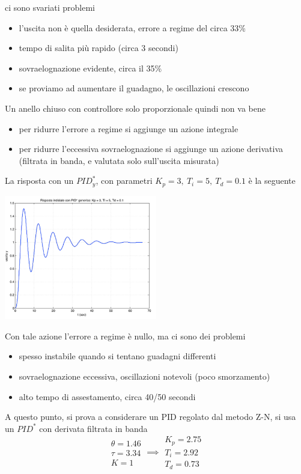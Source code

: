 \documentclass[10pt, letterpaper]{report}
\begin{document}
ci sono svariati problemi\begin{itemize}
    \item l'uscita non è quella desiderata, errore a regime del circa 33\% 
    \item tempo di salita più rapido (circa 3 secondi)
    \item sovraelognazione evidente, circa il 35\% 
    \item se proviamo ad aumentare il guadagno, le oscillazioni crescono 
\end{itemize}
Un anello chiuso con controllore solo proporzionale quindi non va bene\begin{itemize}
    \item per ridurre l'errore a regime si aggiunge un azione integrale 
    \item per ridurre l'eccessiva sovraelognazione si aggiunge un azione derivativa (filtrata in banda, e valutata solo sull'uscita misurata)
\end{itemize}
La risposta con un $PID_y^*$, con parametri 
$K_p=3, \ T_i=5,\ T_d=0.1$
è la seguente
\begin{center}
    \includegraphics[width=0.5\textwidth]{images/tentativi2.png}
\end{center}
Con tale azione l'errore a regime è nullo, ma ci sono dei problemi\begin{itemize}
    \item spesso instabile quando si tentano guadagni differenti 
    \item sovraelognazione eccessiva, oscillazioni notevoli (poco smorzamento)
    \item alto tempo di assestamento, circa 40/50 secondi
\end{itemize}
A questo punto, si prova a considerare un PID regolato dal metodo Z-N, si usa un $PID^*$ con derivata filtrata in banda 
$$ \begin{matrix}
    \theta = 1.46\\
    \tau = 3.34\\ 
    K=1
\end{matrix}\implies 
\begin{matrix}
    K_p=2.75\\ 
    T_i=2.92 \\ 
    T_d=0.73 
\end{matrix}$$
\end{document}
